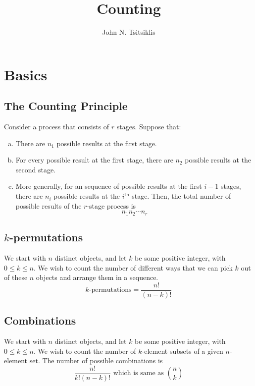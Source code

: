 \documentclass{tufte-handout}
\author{John N. Tsitsiklis}
\title{Counting}
\theoremstyle{definition} \newtheorem{definition}{Definition}
\theoremstyle{definition} \newtheorem{remark}{Remark}
\theoremstyle{definition} \newtheorem{example}{Example}
\begin{document}
\maketitle
\section{Basics}

\subsection{The Counting Principle}
Consider a process that consists of $r$ stages. Suppose that:
\begin{enumerate}[(a)]
\item There are $n_1$ possible results at the first stage.
\item For every possible result at the first stage, there are $n_2$
  possible results at the second stage.

\item More generally, for an sequence of possible results at the first
  $i - 1$ stages, there are $n_i$ possible results at the $i^{\text{th}}$
  stage. Then, the total number of possible results of the $r$-stage
  process is
  \begin{equation*}
    n_1 n_2 \cdots n_r
  \end{equation*}
\end{enumerate}

\subsection{$k$-permutations}
We start with $n$ distinct objects, and let $k$ be some positive integer,
with $0 \leq k \leq n$. We wish to count the number of different ways
that we can pick $k$ out of these $n$ objects and arrange them in a
sequence.
\begin{equation*}
  k\text{-permutations} = \frac{n!}{(n-k)!}
\end{equation*}

\subsection{Combinations}
We start with $n$ distinct objects, and let $k$ be some positive integer,
with $0 \leq k \leq n$. We wish to count the number of $k$-element
subsets of a given $n$-element set. The number of possible combinations
is
\begin{equation*}
  \frac{n!}{k!(n-k)!} \text{ which is same as } \binom{n}{k}
\end{equation*}
\end{document}
